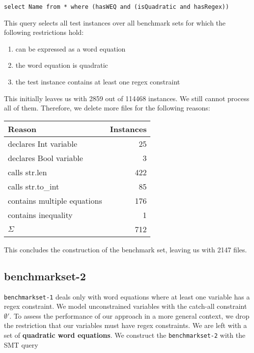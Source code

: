 \begin{verbatim}
select Name from * where (hasWEQ and (isQuadratic and hasRegex))
\end{verbatim}

\newpage

This query selects all test instances over all benchmark sets for which the following restrictions hold:
\begin{enumerate}
    \item can be expressed as a word equation
    \item the word equation is quadratic
    \item the test instance contains at least one regex constraint
\end{enumerate}

This initially leaves us with 2859 out of 114468 instances. We still cannot process all of them. Therefore, we delete more files for the following reasons:

\begin{center}
\begin{tabular}{|l|r|}
    \hline
    Reason & Instances \\
    \hline
    declares Int variable & 25 \\
    declares Bool variable & 3 \\
    calls str.len & 422 \\
    calls str.to\_int & 85 \\
    contains multiple equations & 176 \\
    contains inequality & 1 \\
    \hline
    $\Sigma$ & 712 \\
    \hline
\end{tabular}
\end{center}

This concludes the construction of the benchmark set, leaving us with 2147 files.

\subsection{benchmarkset-2}
\texttt{benchmarkset-1} deals only with word equations where at least one variable has a regex constraint. We model unconstrained variables with the catch-all constraint $\emptyset'$. To assess the performance of our approach in a more general context, we drop the restriction that our variables must have regex constraints. We are left with a set of \textbf{quadratic word equations}. We construct the \texttt{benchmarkset-2} with the SMT query

